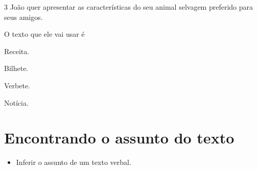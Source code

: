 \num{3} João quer apresentar as características do seu animal selvagem
preferido para seus amigos.

O texto que ele vai usar é

\begin{escolha}
	\item Receita.

	\item Bilhete.

	\item Verbete.

	\item Notícia.
\end{escolha}

\chapter{Encontrando o assunto do texto}


\begin{itemize}
\item Inferir o assunto de um texto verbal.
\end{itemize}


